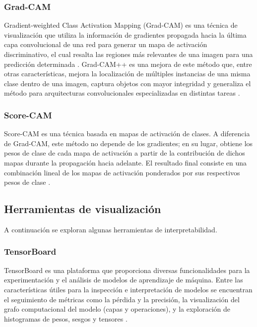 \subsubsection{Grad-CAM}
Gradient-weighted Class Activation Mapping (Grad-CAM) es una técnica de visualización que 
utiliza la información de gradientes propagada hacia la última capa convolucional de una red 
para generar un mapa de activación discriminativo, el cual resalta las regiones más relevantes 
de una imagen para una predicción determinada \parencite{selvaraju2017grad}. Grad-CAM++ es una 
mejora de este método que, entre otras características, mejora la localización de múltiples 
instancias de una misma clase dentro de una imagen, captura objetos con mayor integridad y 
generaliza el método para arquitecturas convolucionales especializadas en distintas 
tareas \parencite{chattopadhay2018grad}.

\subsubsection{Score-CAM}
Score-CAM es una técnica basada en mapas de activación de clases. A diferencia de Grad-CAM, 
este método no depende de los gradientes; en su lugar, obtiene los pesos de clase de cada 
mapa de activación a partir de la contribución de dichos mapas durante la propagación hacia 
adelante. El resultado final consiste en una combinación lineal de los mapas de activación 
ponderados por sus respectivos pesos de clase \parencite{wang2020score}.

\subsection{Herramientas de visualización}
A continuación se exploran algunas herramientas de interpretabilidad.

\subsubsection{TensorBoard}
TensorBoard es una plataforma que proporciona diversas funcionalidades para la experimentación y el análisis 
de modelos de aprendizaje de máquina. Entre las características útiles para la inspección e 
interpretación de modelos se encuentran el seguimiento de métricas como la pérdida y la precisión, 
la visualización del grafo computacional del modelo (capas y operaciones), y la exploración de histogramas 
de pesos, sesgos y tensores \parencite{tensorboard_docs}.

